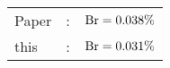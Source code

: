      \begin{tabular}{lcr}
          Paper &:& $\mathrm{Br}  = 0.038\%$ \\
          this      &:& $\mathrm{Br}  = 0.031\%$ \\        
      \end{tabular}
